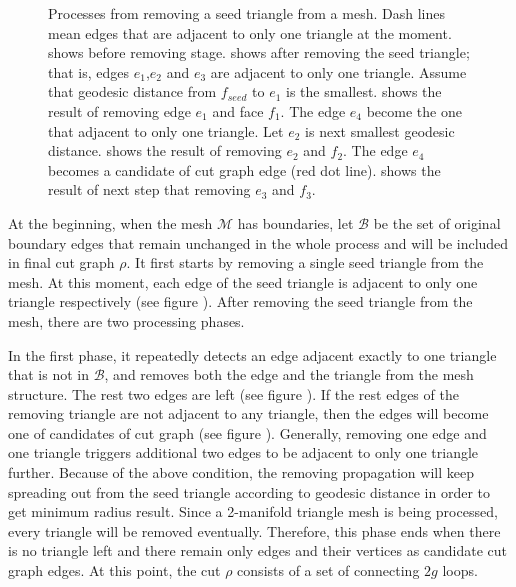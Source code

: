 \documentclass[a4paper,twoside]{article}
\begin{document}
\begin{figure}[t]
	\caption{Processes from removing a seed triangle from a mesh. Dash lines mean edges that are adjacent to only one triangle at the moment.  shows before removing stage.  shows after removing the seed triangle; that is, edges $e_1$,$e_2$ and $e_3$ are adjacent to only one triangle. Assume that geodesic distance from $f_{seed}$ to $e_1$ is the smallest.  shows the result of removing edge $e_1$ and face $f_1$. The edge $e_4$ become the one that adjacent to only one triangle. Let $e_2$ is next smallest geodesic distance.  shows the result of removing $e_2$ and $f_2$. The edge $e_4$ becomes a candidate of cut graph edge (red dot line).  shows the result of next step that removing $e_3$ and $f_3$.}
	\label{fig:OriginalGenusReduceMethodStepByStep}
\end{figure}

At the beginning, when the mesh $\mathscr{M}$ has boundaries, let $\mathscr{B}$  be the set of original boundary edges that remain unchanged in the whole process and will be included in final cut graph ${\rho}$. It first starts by removing a single seed triangle from the mesh. At this moment, each edge of the seed triangle is adjacent to only one triangle respectively (see figure ).  After removing the seed triangle from the mesh, there are two processing phases.

In the first phase, it repeatedly detects an edge adjacent exactly to one triangle that is not in $\mathscr{B}$, and removes both the edge and the triangle from the mesh structure. The rest two edges are left (see figure ). If the rest edges of the removing triangle are not adjacent to any triangle, then the edges will become one of candidates of cut graph (see figure ). Generally, removing one edge and one triangle triggers additional two edges to be adjacent to only one triangle further. Because of the above condition, the removing propagation will keep spreading out from the seed triangle according to geodesic distance in order to get minimum radius result. Since a 2-manifold triangle mesh is being processed, every triangle will be removed eventually. Therefore, this phase ends when there is no triangle left and there remain only edges and their vertices as candidate cut graph edges. At this point, the cut $\rho$ consists of a set of connecting $2g$ loops.
\end{document}
